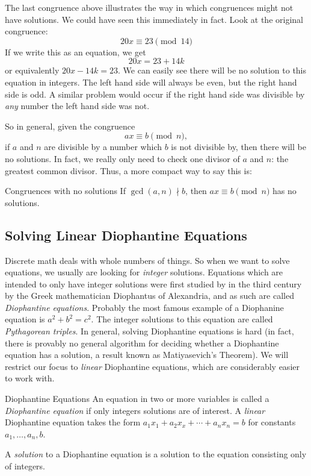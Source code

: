 \documentclass[12pt]{article}
\begin{document}
The last congruence above illustrates the way in which congruences might not have solutions.  We could have seen this immediately in fact.  Look at the original congruence:
\[20x \equiv 23 \pmod{14}\]
If we write this as an equation, we get 
\[20x = 23 + 14k\]
or equivalently $20x - 14k = 23$.  We can easily see there will be no solution to this equation in integers.  The left hand side will always be even, but the right hand side is odd.  A similar problem would occur if the right hand side was divisible by {\em any} number the left hand side was not.  

So in general, given the congruence
\[ax \equiv b \pmod{n},\]
if $a$ and $n$ are divisible by a number which $b$ is not divisible by, then there will be no solutions.  In fact, we really only need to check one divisor of $a$ and $n$: the greatest common divisor.  Thus, a more compact way to say this is:

\begin{defbox}{Congruences with no solutions}
 If $\gcd(a,n) \nmid b$, then $ax \equiv b \pmod{n}$ has no solutions.
\end{defbox}


\subsection{Solving Linear Diophantine Equations}

Discrete math deals with whole numbers of things.  So when we want to solve equations, we usually are looking for \emph{integer} solutions.  Equations which are intended to only have integer solutions were first studied by in the third century by the Greek mathematician Diophantus of Alexandria, and as such are called \emph{Diophantine equations}.  Probably the most famous example of a Diophanine equation is $a^2 + b^2 = c^2$.  The integer solutions to this equation are called \emph{Pythagorean triples}.  In general, solving Diophantine equations is hard (in fact, there is provably no general algorithm for deciding whether a Diophantine equation has a solution, a result known as Matiyasevich's Theorem).  We will restrict our focus to \emph{linear} Diophantine equations, which are considerably easier to work with.

\begin{defbox}{Diophantine Equations}
An equation in two or more variables is called a \emph{Diophantine equation} if only integers solutions are of interest.  A \emph{linear} Diophantine equation takes the form $a_1x_1 + a_2x_x + \cdots + a_nx_n = b$ for constants $a_1,\ldots, a_n, b$.  

A \emph{solution} to a Diophantine equation is a solution to the equation consisting only of integers.
\end{defbox}
\end{document}
